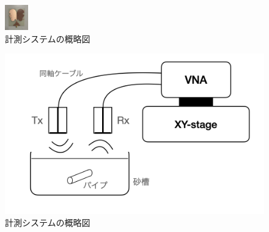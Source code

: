 \documentclass[11pt,a4paper,uplatex]{ujarticle}
\begin{document}
    \begin{figure}[hbtp]
      \centering
      \includegraphics[keepaspectratio, width=10mm]{Images/rxantenna.png}
      \caption{計測システムの概略図}\label{fig:rxantenna}
    \end{figure}

    \begin{figure}[hbtp]
      \centering
      \includegraphics[keepaspectratio, width=130mm]{Images/XYstage_configuration.png}
      \caption{計測システムの概略図}\label{fig:XYstage_configuration}
    \end{figure}
\end{document}
